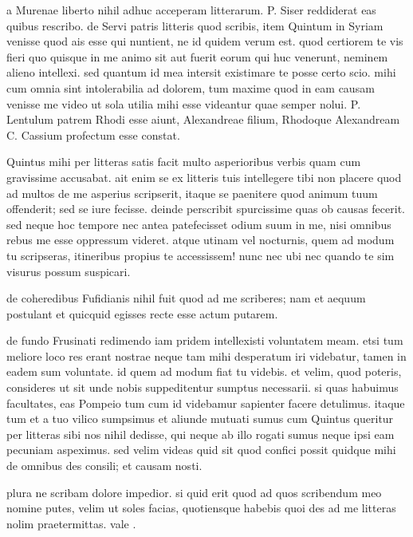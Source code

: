 


 a Murenae liberto nihil adhuc acceperam litterarum. P. Siser reddiderat eas quibus rescribo. de Servi patris litteris quod scribis, item Quintum in Syriam venisse quod ais esse qui nuntient, ne id quidem verum est. quod certiorem te vis fieri quo quisque in me animo sit aut fuerit eorum qui huc venerunt, neminem alieno intellexi. sed quantum id mea intersit existimare te posse certo scio. mihi cum omnia sint intolerabilia ad dolorem, tum maxime quod in eam causam venisse me video ut sola utilia mihi esse videantur quae semper nolui. P. Lentulum patrem Rhodi esse aiunt, Alexandreae filium, Rhodoque Alexandream C. Cassium profectum esse constat.

 Quintus mihi per litteras satis facit multo asperioribus verbis quam cum gravissime accusabat. ait enim se ex litteris tuis intellegere tibi non placere quod ad multos de me asperius scripserit, itaque se paenitere quod animum tuum offenderit; sed se iure fecisse. deinde perscribit spurcissime quas ob causas fecerit. sed neque hoc tempore nec antea patefecisset odium suum in me, nisi omnibus rebus me esse oppressum videret. atque utinam vel nocturnis, quem ad modum tu scripseras, itineribus propius te accessissem! nunc nec ubi nec quando te sim visurus possum suspicari.

 de coheredibus Fufidianis nihil fuit quod ad me scriberes; nam et aequum postulant et quicquid egisses recte esse actum putarem.

 de fundo Frusinati redimendo iam pridem intellexisti voluntatem meam. etsi tum meliore loco res erant nostrae neque tam mihi desperatum iri videbatur, tamen in eadem sum voluntate. id quem ad modum fiat tu videbis. et velim, quod poteris, consideres ut sit unde nobis suppeditentur sumptus necessarii. si quas habuimus facultates, eas Pompeio tum cum id videbamur sapienter facere detulimus. itaque tum et a tuo vilico sumpsimus et aliunde mutuati sumus cum Quintus queritur per litteras sibi nos nihil dedisse, qui neque ab illo rogati sumus neque ipsi eam pecuniam aspeximus. sed velim videas quid sit quod confici possit quidque mihi de omnibus des consili; et causam nosti.

 plura ne scribam dolore impedior. si quid erit quod ad quos scribendum meo nomine putes, velim ut soles facias, quotiensque habebis quoi des ad me litteras nolim praetermittas. vale .
